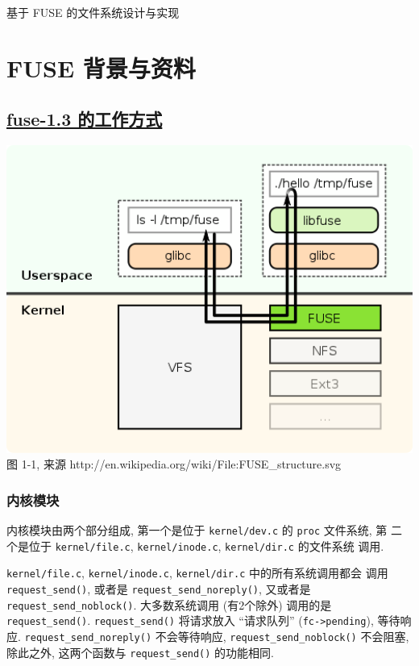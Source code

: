 \documentclass[nofonts]{ctexart}
\begin{document}
\begin{center}
    \Huge{基于 FUSE 的文件系统设计与实现}\label{ux57faux4e8e-fuse-ux7684ux6587ux4ef6ux7cfbux7edfux8bbeux8ba1ux4e0eux5b9eux73b0}
\end{center}

\section{FUSE 背景与资料}\label{fuse-ux80ccux666fux4e0eux8d44ux6599}

\subsection{\href{http://fuse.sourceforge.net/doxygen/index.html\#section1}{fuse-1.3
的工作方式}}\label{fuse-1.3-ux7684ux5de5ux4f5cux65b9ux5f0f}

\includegraphics[width=15cm]{./images/./FUSE_structure.svg.png}\\图 1-1, 来源
http://en.wikipedia.org/wiki/File:FUSE\_structure.svg

\subsubsection{内核模块}\label{ux5185ux6838ux6a21ux5757}

内核模块由两个部分组成, 第一个是位于 \texttt{kernel/dev.c} 的
\texttt{proc} 文件系统, 第 二个是位于 \texttt{kernel/file.c},
\texttt{kernel/inode.c}, \texttt{kernel/dir.c} 的文件系统 调用.

\texttt{kernel/file.c}, \texttt{kernel/inode.c}, \texttt{kernel/dir.c}
中的所有系统调用都会 调用 \texttt{request\_send()}, 或者是
\texttt{request\_send\_noreply()}, 又或者是
\texttt{request\_send\_noblock()}. 大多数系统调用 (有2个除外) 调用的是
\texttt{request\_send()}. \texttt{request\_send()} 将请求放入
``请求队列'' (\texttt{fc-\textgreater{}pending}), 等待响应.
\texttt{request\_send\_noreply()} 不会等待响应,
\texttt{request\_send\_noblock()} 不会阻塞, 除此之外, 这两个函数与
\texttt{request\_send()} 的功能相同.
\end{document}
